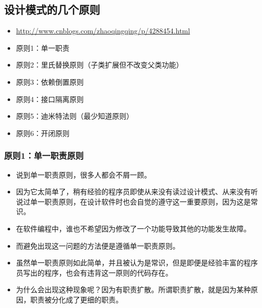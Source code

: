 \documentclass[9pt, b5paper]{article}
\begin{document}
\subsection{设计模式的几个原则}
\label{sec:org6ff7c2a}
\begin{itemize}
\item \url{http://www.cnblogs.com/zhaoqingqing/p/4288454.html}
\item 原则1：单一职责
\item 原则2：里氏替换原则（子类扩展但不改变父类功能）
\item 原则3：依赖倒置原则
\item 原则4：接口隔离原则
\item 原则5：迪米特法则（最少知道原则）
\item 原则6：开闭原则
\end{itemize}
\subsubsection{原则1：单一职责原则}
\label{sec:org020d9a4}
\begin{itemize}
\item 说到单一职责原则，很多人都会不屑一顾。
\item 因为它太简单了，稍有经验的程序员即使从来没有读过设计模式、从来没有听说过单一职责原则，在设计软件时也会自觉的遵守这一重要原则，因为这是常识。
\item 在软件编程中，谁也不希望因为修改了一个功能导致其他的功能发生故障。
\item 而避免出现这一问题的方法便是遵循单一职责原则。
\item 虽然单一职责原则如此简单，并且被认为是常识，但是即便是经验丰富的程序员写出的程序，也会有违背这一原则的代码存在。
\item 为什么会出现这种现象呢？因为有职责扩散。所谓职责扩散，就是因为某种原因，职责被分化成了更细的职责。
\end{itemize}
\end{document}
